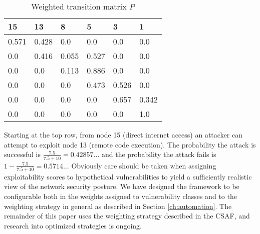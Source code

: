\begin{table}[H]
\caption{Weighted transition matrix $P$}
\centering
\begin{tabular}{@{}llllll@{}}
\toprule
15 & 13 & 8 & 5 & 3 & 1 \\ \midrule
0.571 & 0.428 & 0.0 & 0.0 & 0.0 & 0.0 \\
0.0 & 0.416 & 0.055 & 0.527 & 0.0 & 0.0 \\
0.0 & 0.0 & 0.113 & 0.886 & 0.0 & 0.0 \\
0.0 & 0.0 & 0.0 & 0.473 & 0.526 & 0.0 \\
0.0 & 0.0 & 0.0 & 0.0 & 0.657 & 0.342 \\
0.0 & 0.0 & 0.0 & 0.0 & 0.0 & 1.0 \\ \bottomrule            
\end{tabular}
\label{fig:eg_transmatrix}
\end{table}

Starting at the top row, from node 15 (direct internet access) an attacker can attempt to exploit node 13 (remote code execution). The probability the attack is successful is $\frac{7.5}{7.5 + 10}=0.42857\dots$ and the probability the attack fails is $1 - \frac{7.5}{7.5 + 10} = 0.5714\dots$ Obviously care should be taken when assigning exploitability scores to hypothetical vulnerabilities to yield a sufficiently realistic view of the network security posture. We have designed the framework to be configurable both in the weights assigned to vulnerability classes and to the weighting strategy in general as described in Section \ref{ch:automation}. The remainder of this paper uses the weighting strategy described in the CSAF, and research into optimized strategies is ongoing. 


